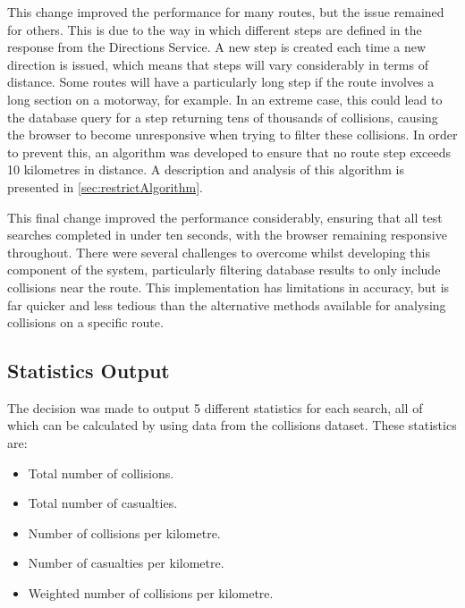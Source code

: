 \documentclass[authoryearcitations]{UoYCSproject}
\begin{document}
This change improved the performance for many routes, but the issue remained for others. This is due to the way in which different steps are defined in the response from the Directions Service. A new step is created each time a new direction is issued, which means that steps will vary considerably in terms of distance. Some routes will have a particularly long step if the route involves a long section on a motorway, for example. In an extreme case, this could lead to the database query for a step returning tens of thousands of collisions, causing the browser to become unresponsive when trying to filter these collisions. In order to prevent this, an algorithm was developed to ensure that no route step exceeds 10 kilometres in distance. A description and analysis of this algorithm is presented in \autoref{sec:restrictAlgorithm}.

This final change improved the performance considerably, ensuring that all test searches completed in under ten seconds, with the browser remaining responsive throughout. There were several challenges to overcome whilst developing this component of the system, particularly filtering database results to only include collisions near the route. This implementation has limitations in accuracy, but is far quicker and less tedious than the alternative methods available for analysing collisions on a specific route.

\subsection{Statistics Output}

The decision was made to output 5 different statistics for each search, all of which can be calculated by using data from the collisions dataset. These statistics are:

\begin{itemize}
	\item Total number of collisions.
	\item Total number of casualties.
	\item Number of collisions per kilometre.
	\item Number of casualties per kilometre.
	\item Weighted number of collisions per kilometre.
\end{itemize}
\end{document}
